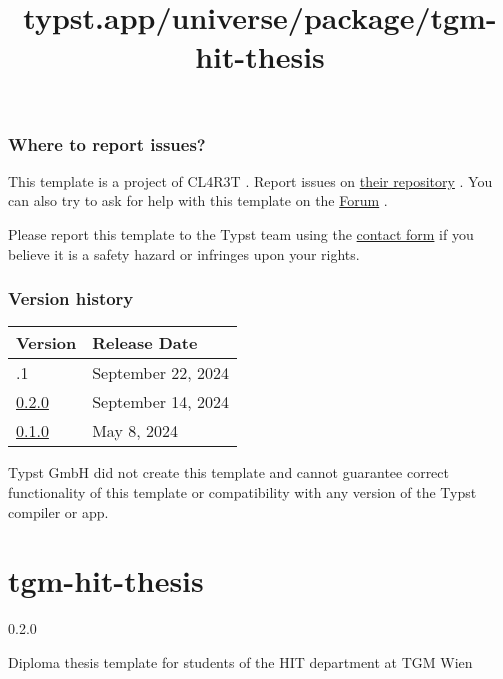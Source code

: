 \subsubsection{Where to report issues?}\label{where-to-report-issues}

This template is a project of CL4R3T . Report issues on
\href{https://github.com/pku-typst/meppp}{their repository} . You can
also try to ask for help with this template on the
\href{https://forum.typst.app}{Forum} .

Please report this template to the Typst team using the
\href{https://typst.app/contact}{contact form} if you believe it is a
safety hazard or infringes upon your rights.

\label{versions}
\subsubsection{Version history}\label{version-history}

\begin{longtable}[]{@{}ll@{}}
\toprule\noalign{}
Version & Release Date \\
\midrule\noalign{}
\endhead
\bottomrule\noalign{}
\endlastfoot
0.2.1 & September 22, 2024 \\
\href{https://typst.app/universe/package/meppp/0.2.0/}{0.2.0} &
September 14, 2024 \\
\href{https://typst.app/universe/package/meppp/0.1.0/}{0.1.0} & May 8,
2024 \\
\end{longtable}

Typst GmbH did not create this template and cannot guarantee correct
functionality of this template or compatibility with any version of the
Typst compiler or app.


\title{typst.app/universe/package/tgm-hit-thesis}

\label{banner}
\label{template-thumbnail}

\section{tgm-hit-thesis}\label{tgm-hit-thesis}

{ 0.2.0 }

Diploma thesis template for students of the HIT department at TGM Wien

